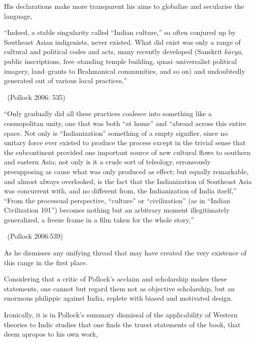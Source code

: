 His declarations make more transparent his aims to globalize and secularise the language,

\begin{myquote}
“Indeed, a stable singularity called “Indian culture,” so often conjured up by Southeast Asian indigenists, never existed. What did exist was only a range of cultural and political codes and acts, many recently developed (Sanskrit \textit{kāvya}, public inscriptions, free–standing temple building, quasi–universalist political imagery, land–grants to Brahmanical communities, and so on) and undoubtedly generated out of various local practices,” 

~\hfill (Pollock 2006: 535)
\end{myquote}

\begin{myquote}
“Only gradually did all these practices coalesce into something like a cosmopolitan unity, one that was both “at home” and “abroad across this entire space. Not only is “Indianization” something of a empty signifier, since no unitary force ever existed to produce the process except in the trivial sense that the subcontinent provided one important source of new cultural flows to southern and eastern Asia; not only is it a crude sort of teleology, erroneously presupposing as cause what was only produced as effect; but equally remarkable, and almost always overlooked, is the fact that the Indianization of Southeast Asia was concurrent with, and no different from, the Indianization of India itself,” “From the processual perspective, “culture” or “civilization” (as in “Indian Civilization 101”) becomes nothing but an arbitrary moment illegitimately generalized, a freeze frame in a film taken for the whole story,” 

~\hfill (Pollock 2006:539) 
\end{myquote}

As he dismisses any unifying thread that may have created the very existence of this range in the first place.

Considering that a critic of Pollock’s acclaim and scholarship makes these statements, one cannot but regard them not as objective scholarship, but an enormous philippic against India, replete with biased and motivated design.

Ironically, it is in Pollock’s summary dismissal of the applicability of Western theories to Indic studies that one finds the truest statements of the book, that deem apropos to his own work,

